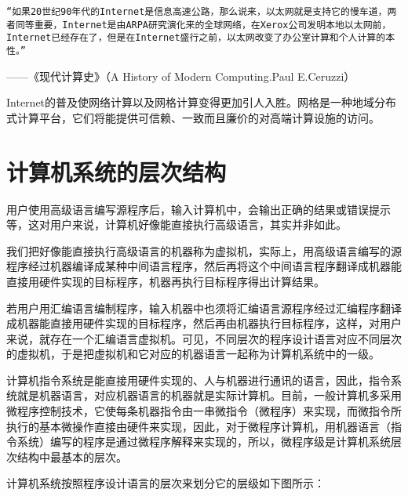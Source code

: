 \begin{verbatim}
“如果20世纪90年代的Internet是信息高速公路，那么说来，以太网就是支持它的慢车道，两者同等重要，Internet是由ARPA研究演化来的全球网络，在Xerox公司发明本地以太网前，Internet已经存在了，但是在Internet盛行之前，以太网改变了办公室计算和个人计算的本性。”
\end{verbatim}

\begin{flushright}
 ——《现代计算史》（A History of Modern Computing.Paul E.Ceruzzi）
\end{flushright}

Internet的普及使网络计算以及网格计算变得更加引人入胜。网格是一种地域分布式计算平台，它们将能提供可信赖、一致而且廉价的对高端计算设施的访问。

\chapter{计算机系统的层次结构}

用户使用高级语言编写源程序后，输入计算机中，会输出正确的结果或错误提示等，这对用户来说，计算机好像能直接执行高级语言，其实并非如此。

我们把好像能直接执行高级语言的机器称为虚拟机，实际上，用高级语言编写的源程序经过机器编译成某种中间语言程序，然后再将这个中间语言程序翻译成机器能直接用硬件实现的目标程序，机器再执行目标程序得出计算结果。

若用户用汇编语言编制程序，输入机器中也须将汇编语言源程序经过汇编程序翻译成机器能直接用硬件实现的目标程序，然后再由机器执行目标程序，这样，对用户来说，就存在一个汇编语言虚拟机。可见，不同层次的程序设计语言对应不同层次的虚拟机，于是把虚拟机和它对应的机器语言一起称为计算机系统中的一级。

计算机指令系统是能直接用硬件实现的、人与机器进行通讯的语言，因此，指令系统就是机器语言，对应机器语言的机器就是实际计算机。目前，一般计算机多采用微程序控制技术，它使每条机器指令由一串微指令（微程序）来实现，而微指令所执行的基本微操作直接由硬件来实现，因此，对于微程序计算机，用机器语言（指令系统）编写的程序是通过微程序解释来实现的，所以，微程序级是计算机系统层次结构中最基本的层次。

计算机系统按照程序设计语言的层次来划分它的层级如下图所示：


